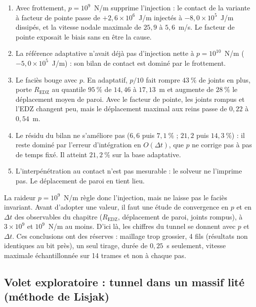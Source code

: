 \begin{enumerate}
\item Avec frottement, $p = 10^9$~N/m supprime l'injection : le contact de la variante à facteur de pointe passe de $+2{,}6\times10^{6}$~J/m injectés à $-8{,}0\times10^{5}$~J/m dissipés, et la vitesse nodale maximale de $25{,}9$ à $5{,}6$~m/s. Le facteur de pointe exposait le biais sans en être la cause.
\item La référence adaptative n'avait déjà pas d'injection nette à $p = 10^{10}$~N/m ($-5{,}0\times10^{5}$~J/m) : son bilan de contact est dominé par le frottement.
\item Le faciès bouge avec $p$. En adaptatif, $p/10$ fait rompre $43~\%$ de joints en plus, porte $R_\text{EDZ}$ au quantile $95~\%$ de $14{,}46$ à $17{,}13$~m et augmente de $28~\%$ le déplacement moyen de paroi. Avec le facteur de pointe, les joints rompus et l'EDZ changent peu, mais le déplacement maximal aux reins passe de $0{,}22$ à $0{,}54$~m.
\item Le résidu du bilan ne s'améliore pas ($6{,}6$ puis $7{,}1~\%$ ; $21{,}2$ puis $14{,}3~\%$) : il reste dominé par l'erreur d'intégration en $O(\Delta t)$, que $p$ ne corrige pas à pas de temps fixé. Il atteint $21{,}2~\%$ sur la base adaptative.
\item L'interpénétration au contact n'est pas mesurable : le solveur ne l'imprime pas. Le déplacement de paroi en tient lieu.
\end{enumerate}

La raideur $p = 10^9$~N/m règle donc l'injection, mais ne laisse pas le faciès invariant. Avant d'adopter une valeur, il faut une étude de convergence en $p$ et en $\Delta t$ des observables du chapitre ($R_\text{EDZ}$, déplacement de paroi, joints rompus), à $3\times10^9$ et $10^9$~N/m au moins. D'ici là, les chiffres du tunnel se donnent avec $p$ et $\Delta t$. Ces conclusions ont des réserves : maillage trop grossier, 4 fils (résultats non identiques au bit près), un seul tirage, durée de $0{,}25$~s seulement, vitesse maximale échantillonnée sur 14 trames et non à chaque pas.

\subsection{Volet exploratoire : tunnel dans un massif lité (méthode de Lisjak)}

